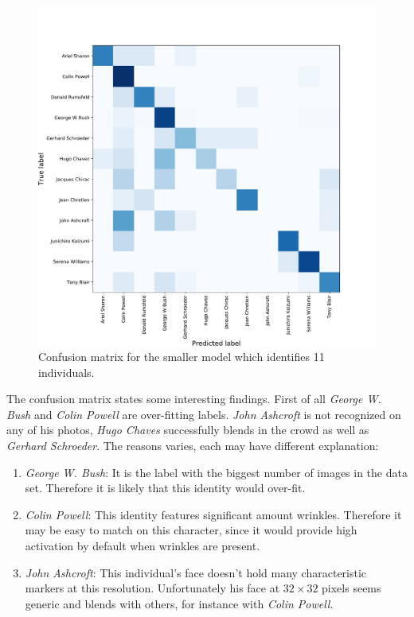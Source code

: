 \begin{figure}[ht!]
    \centering
    \includegraphics[width=\textwidth]{obrazky-figures/confusion.pdf}
    \caption{Confusion matrix for the smaller model which identifies 11 individuals.}
    \label{fig:confusion1}
\end{figure}

The confusion matrix states some interesting findings. First of all \textit{George W. Bush} and \textit{Colin Powell} are over-fitting labels. \textit{John Ashcroft} is not recognized on any of his photos, \textit{Hugo Chaves} successfully blends in the crowd as well as \textit{Gerhard Schroeder}. The reasons varies, each may have different explanation:

\begin{enumerate}
    \item \textit{George W. Bush}: It is the label with the biggest number of images in the data set. Therefore it is likely that this identity would over-fit.
    \item \textit{Colin Powell}: This identity features significant amount wrinkles. Therefore it may be easy to match on this character, since it would provide high activation by default when wrinkles are present.
    \item \textit{John Ashcroft}: This individual's face doesn't hold many characteristic markers at this resolution. Unfortunately his face at $32\times32$ pixels seems generic and blends with others, for instance with \textit{Colin Powell}.
\end{enumerate}
